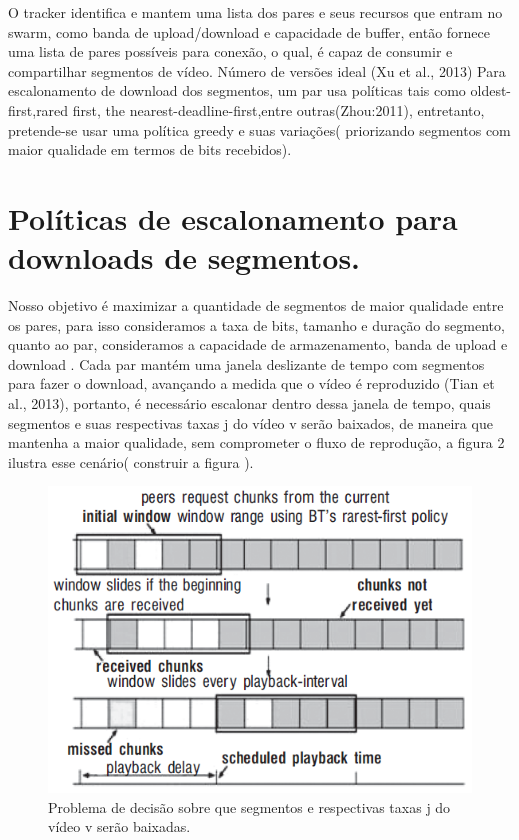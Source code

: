 \documentclass[
	12pt,				%
	oneside,			%
	a4paper,			%
	english,			%
	brazil				%
	]{abntex2ppgsi}
\begin{document}
O tracker identifica e mantem uma lista dos pares e seus recursos que entram no swarm, como banda de upload/download e capacidade de buffer, então fornece uma lista de pares possíveis para conexão, o qual, é capaz de consumir e compartilhar segmentos de vídeo.
Número de versões ideal (Xu et al., 2013)
Para escalonamento de download dos segmentos, um par usa políticas tais como oldest-first,rared first, the nearest-deadline-first,entre outras(Zhou:2011), entretanto, pretende-se usar uma política greedy e suas variações( priorizando segmentos com maior qualidade em termos de bits recebidos).



\section{Políticas de escalonamento para downloads de segmentos.}

Nosso objetivo é maximizar a quantidade de segmentos de maior qualidade entre os pares, para isso consideramos a taxa de bits, tamanho e duração do segmento, quanto ao par, consideramos a capacidade de armazenamento, banda de upload e download . Cada par mantém uma janela deslizante de tempo com segmentos para fazer o download, avançando a medida que o vídeo é reproduzido (Tian et al., 2013), portanto, é necessário escalonar dentro dessa janela de tempo, quais segmentos e suas respectivas taxas j do vídeo v serão baixados, de maneira que mantenha a maior qualidade, sem comprometer o fluxo de reprodução, a figura 2 ilustra esse cenário( construir a figura ).

\begin{figure}[H]%
	\centering
 	  \caption{Problema de decisão sobre que segmentos e respectivas taxas j do vídeo v serão baixadas.}
		\includegraphics{figuras/janeladetempo.png}
\end{figure}
\end{document}
